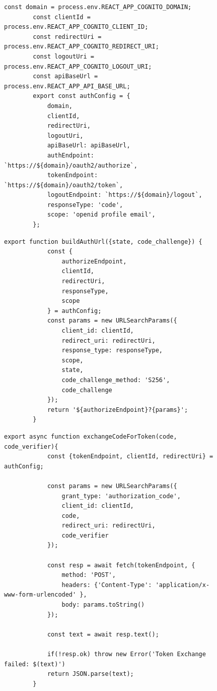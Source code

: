 \begin{figure}[H]
    \begin{lstlisting}[caption=AuthConfig, breaklines = true, label=list:authconfig]
        const domain = process.env.REACT_APP_COGNITO_DOMAIN;
        const clientId = process.env.REACT_APP_COGNITO_CLIENT_ID; 
        const redirectUri = process.env.REACT_APP_COGNITO_REDIRECT_URI;
        const logoutUri = process.env.REACT_APP_COGNITO_LOGOUT_URI;
        const apiBaseUrl = process.env.REACT_APP_API_BASE_URL;
        export const authConfig = {
            domain,
            clientId,
            redirectUri,
            logoutUri,
            apiBaseUrl: apiBaseUrl,
            authEndpoint: `https://${domain}/oauth2/authorize`,
            tokenEndpoint: `https://${domain}/oauth2/token`,
            logoutEndpoint: `https://${domain}/logout`,
            responseType: 'code',
            scope: 'openid profile email',
        };
    \end{lstlisting}
\end{figure}

\begin{figure}[H]
    \begin{lstlisting}[caption=Build-Auth Methode, breaklines = true, label=list:buildAuth]
        export function buildAuthUrl({state, code_challenge}) {
            const {
                authorizeEndpoint,
                clientId,
                redirectUri,
                responseType,
                scope
            } = authConfig;
            const params = new URLSearchParams({
                client_id: clientId,
                redirect_uri: redirectUri,
                response_type: responseType,
                scope,
                state,
                code_challenge_method: 'S256',
                code_challenge
            });
            return '${authorizeEndpoint}?{params}';
        }
    \end{lstlisting}
\end{figure}

\begin{figure}[H]
    \begin{lstlisting}[caption=ExchangeCodeForToken Methode, breaklines = true, label=list:exchangecodefortoken]
        export async function exchangeCodeForToken(code, code_verifier){
            const {tokenEndpoint, clientId, redirectUri} = authConfig;

            const params = new URLSearchParams({
                grant_type: 'authorization_code',
                client_id: clientId,
                code,
                redirect_uri: redirectUri,
                code_verifier
            });

            const resp = await fetch(tokenEndpoint, {
                method: 'POST',
                headers: {'Content-Type': 'application/x-www-form-urlencoded' },
                body: params.toString()
            });

            const text = await resp.text();

            if(!resp.ok) throw new Error('Token Exchange failed: $(text)')
            return JSON.parse(text);
        }
    \end{lstlisting}
\end{figure}

